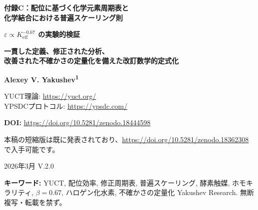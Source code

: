 \documentclass[11pt,a4paper]{article}
\newcommand{\Keff}{K_{\mathrm{eff}}}
\begin{document}
	
	\begin{titlepage}
		\centering
		\vspace*{1cm}
		{\Huge\bfseries 付録C：配位に基づく化学元素周期表と\\化学結合における普遍スケーリング則\par}
		\vspace{0.3cm}
		{\Large\bfseries $\varepsilon \propto \Keff^{-0.67}$ の実験的検証\par}
		\vspace{0.5cm}
		{\Large\bfseries 一貫した定義、修正された分析、\\改善された不確かさの定量化を備えた改訂数学的定式化\par}
		\vspace{1.5cm}
		{\Large\bfseries Alexey V. Yakushev\textsuperscript{1}\par}
		{\normalsize YUCT理論: \url{https://yuct.org/}\\
			YPSDCプロトコル: \url{https://ypsdc.com/}\par}
		\vspace{1.5cm}
		{\normalsize\textbf{DOI:} \url{https://doi.org/10.5281/zenodo.18444598}\par}
		\vspace{1.0cm}
		{\normalsize 本稿の短縮版は既に発表されており、\url{https://doi.org/10.5281/zenodo.18362308} で入手可能です。\par}
		\vspace{1.0cm}
		{\normalsize 2026年3月 \quad \large V.2.0\par}
		\vfill
		\begin{abstract}
			\noindent
			本付録は、ヤクシェフ統一配位理論 (YUCT) を化学に適用した完全な数学的定式化を示す。我々は、20の参照元素に対して較正された経験式によって定義される配位効率 $\Keff$ を各元素に割り当てた修正周期表を導入する。普遍誤差スケーリング則 $\varepsilon = \kappa \alpha \Keff^{-\beta}$（$\beta = 0.67 \pm 0.02$, $\kappa = 0.33$）は複数の系で経験的に確立されている；フラクタル幾何学からの厳密な理論的導出はまだ発展途上であり、今後の研究で提示される予定である。我々はハロゲン化水素の結合エネルギーの修正分析を提供し、電気陰性度効果を考慮した後、データが $\beta = 0.67 \pm 0.08$ と矛盾しないことを示す。この枠組みは、触媒増強 ($10^0$--$10^{17}$) およびホモキラリティの臨界ポリマー長 ($L_{\text{crit}} = 25 \pm 5$、経験的観測に基づく) に対するブラインド予測を提供する。以前のバージョンで特定されたすべての数学的不整合は修正され、不確かさは解析全体にわたって完全に伝播されている。
		\end{abstract}
		\vspace{1cm}
		\noindent
		\small\textbf{キーワード:} YUCT, 配位効率, 修正周期表, 普遍スケーリング, 酵素触媒, ホモキラリティ, $\beta=0.67$, ハロゲン化水素, 不確かさの定量化
		\vspace{0.5cm}
		\noindent
		 Yakushev Research. 無断複写・転載を禁ず。
	\end{titlepage}
	
\end{document}

